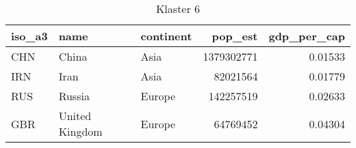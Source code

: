 \begin{table}[h!]
   \centering
   \caption{Klaster 6}
   \label{tab:cl6}
   \begin{tabular}{lllrr}
      \toprule
      iso\_a3 & name           & continent & pop\_est   & gdp\_per\_cap \\
      \midrule
      CHN     & China          & Asia      & 1379302771 & 0.01533       \\
      IRN     & Iran           & Asia      & 82021564   & 0.01779       \\
      RUS     & Russia         & Europe    & 142257519  & 0.02633       \\
      GBR     & United Kingdom & Europe    & 64769452   & 0.04304       \\
      \bottomrule
   \end{tabular}
\end{table}
